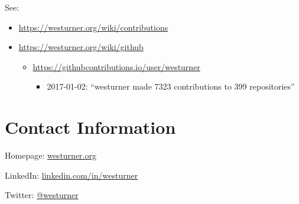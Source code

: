 \documentclass[letter,,openany,oneside]{sphinxhowto}
\begin{document}
See:
\begin{itemize}
\item {} 
\url{https://westurner.org/wiki/contributions}

\item {} 
\url{https://westurner.org/wiki/github}
\begin{itemize}
\item {} 
\url{https://githubcontributions.io/user/westurner}
\begin{itemize}
\item {} 
2017-01-02: ``westurner made 7323 contributions to 399 repositories''

\end{itemize}

\end{itemize}

\end{itemize}


\section{Contact Information}
\label{resume:contact-information}
\begin{DUlineblock}{0em}
\item[] Homepage: \href{https://westurner.org}{westurner.org}
\item[] LinkedIn: \href{http://www.linkedin.com/in/westurner}{linkedin.com/in/westurner}
\item[] Twitter: \href{https://twitter.com/westurner}{@westurner}
\end{DUlineblock}



\renewcommand{\indexname}{Index}
\end{document}
